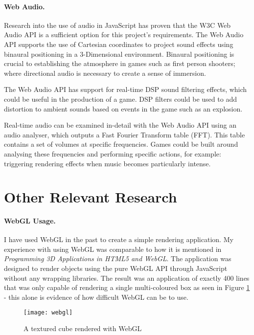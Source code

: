 
\paragraph{Web Audio.}
Research into the use of audio in JavaScript has proven that the W3C Web Audio API is a sufficient option for this project's requirements. The Web Audio API supports the use of Cartesian coordinates to project sound effects using binaural positioning in a 3-Dimensional environment.\cite{webaudio} Binaural positioning is crucial to establishing the atmosphere in games such as first person shooters; where directional audio is necessary to create a sense of immersion.

The Web Audio API has support for real-time DSP sound filtering effects, which could be useful in the production of a game. DSP filters could be used to add distortion to ambient sounds based on events in the game such as an explosion.

Real-time audio can be examined in-detail with the Web Audio API using an audio analyser, which outputs a Fast Fourier Transform table (FFT). This table contains a set of volumes at specific frequencies. Games could be built around analysing these frequencies and performing specific actions, for example: triggering rendering effects when music becomes particularly intense.

\section{Other Relevant Research}
\paragraph{WebGL Usage.}
I have used WebGL in the past to create a simple rendering application. My experience with using WebGL was comparable to how it is mentioned in \emph{Programming 3D Applications in HTML5 and WebGL}\cite{parisi2014programming}. The application was designed to render objects using the pure WebGL API through JavaScript without any wrapping libraries. The result was an application of exactly 400 lines that was only capable of rendering a single multi-coloured box as seen in Figure \ref{fig:webgl} - this alone is evidence of how difficult WebGL can be to use.

\begin{figure}[h]
	\centering
	\texttt{[image: webgl]}
	\caption{A textured cube rendered with WebGL}
	\label{fig:webgl}
\end{figure}

